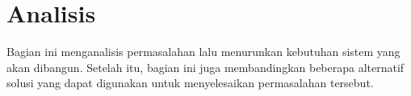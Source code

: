 \section{Analisis}
\label{sec:analisis}

Bagian ini menganalisis permasalahan lalu menurunkan kebutuhan sistem yang akan dibangun. Setelah itu, bagian ini juga membandingkan beberapa alternatif solusi yang dapat digunakan untuk menyelesaikan permasalahan tersebut.




